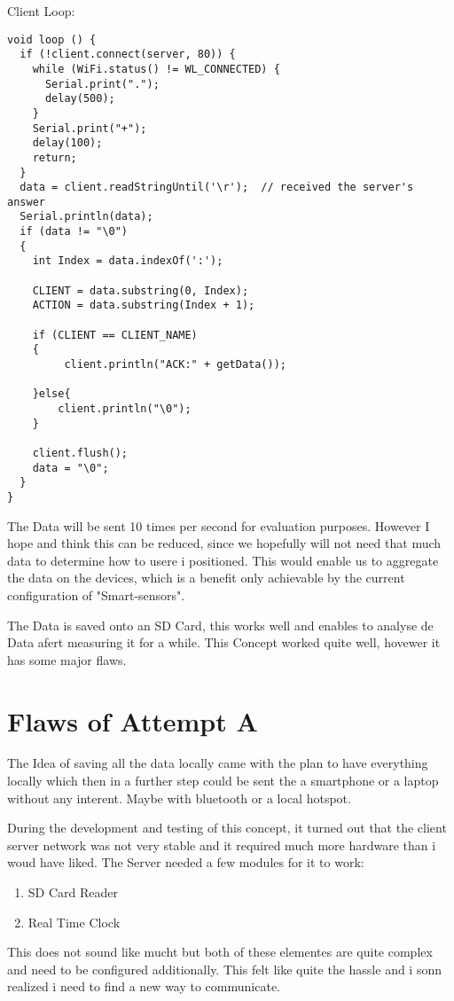 Client Loop:

\begin{lstlisting}
void loop () {
  if (!client.connect(server, 80)) {
    while (WiFi.status() != WL_CONNECTED) {
      Serial.print(".");
      delay(500);
    }
    Serial.print("+");
    delay(100);
    return;
  }
  data = client.readStringUntil('\r');  // received the server's answer
  Serial.println(data);
  if (data != "\0")
  {
    int Index = data.indexOf(':');

    CLIENT = data.substring(0, Index);
    ACTION = data.substring(Index + 1);

    if (CLIENT == CLIENT_NAME)
    {
         client.println("ACK:" + getData());
      
    }else{
        client.println("\0");
    }

    client.flush();
    data = "\0";
  }
}
\end{lstlisting}

The Data will be sent 10 times per second for evaluation purposes. 
However I hope and think this can be reduced, since we hopefully will not need that much data to determine how to usere i positioned. This would enable us to aggregate the data on the devices, which is a benefit only achievable by the current configuration of "Smart-sensors".

The Data is saved onto an SD Card, this works well and enables to analyse de Data afert measuring it for a while. This Concept worked quite well, hovewer it has some major flaws. 

\section{Flaws of Attempt A}

The Idea of saving all the data locally came with the plan to have everything locally which then in a further step could be sent the a smartphone or a laptop without any interent. Maybe with bluetooth or a local hotspot. 

During the development and testing of this concept, it turned out that the client server network was not very stable and it required much more hardware than i woud have liked. 
The Server needed a few modules for it to work: 
\begin{enumerate}
    \item SD Card Reader
    \item Real Time Clock
\end{enumerate}

This does not sound like mucht but both of these elementes are quite complex and need to be configured additionally. This felt like quite the hassle and i sonn realized i need to find a new way to communicate.

